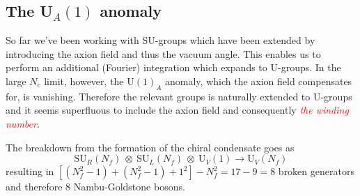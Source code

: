 \documentclass[a4,10pt,titlepage]{article}
\renewcommand\[{\begin{equation*}}
\renewcommand\]{\end{equation*}}
\numberwithin{equation}{section}
\newcommand{\ot}{\:\otimes\:}
\newcommand{\lp}{\left}
\newcommand{\rp}{\right}
\newcommand{\edit}[1]{\textcolor{red}{\textit{#1}}}
\newcommand{\SU}{\text{SU}}
\newcommand{\U}{\text{U}}
\begin{document}
\subsection{The U$_A(1)$ anomaly}
So far we've been working with SU-groups which have been extended by introducing the axion field and thus the vacuum angle. This enables us to perform an additional (Fourier) integration which expands to U-groups. In the large $N_c$ limit, however, the U$(1)_A$ anomaly, which the axion field compensates for, is vanishing. Therefore the relevant groups is naturally extended to U-groups and it seems superfluous to include the axion field and consequently \edit{the winding number}.

The breakdown from the formation of the chiral condensate goes as
\[
\SU_R(N_f)\ot\SU_L(N_f)\ot\U_V(1)\rightarrow\U_V(N_f)
\]
resulting in $\lp[(N_f^2-1)+(N_f^2-1)+1^2\rp]-N_f^2=17-9=8$ broken generators and therefore 8 Nambu-Goldstone bosons.
\end{document}
